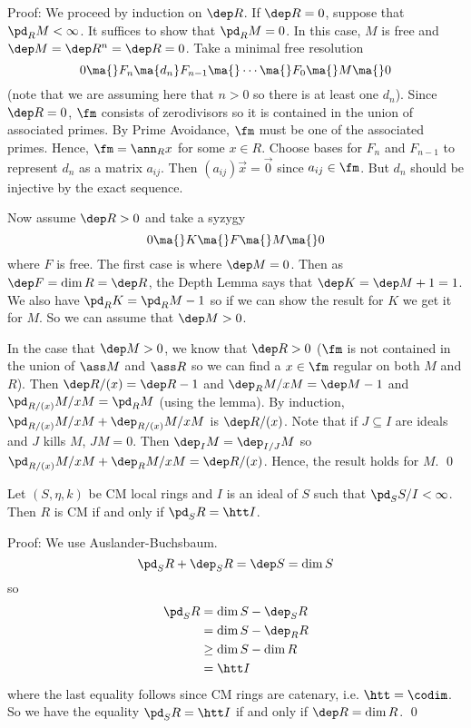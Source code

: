 \noindent Proof: We proceed by induction on $\dep R$. If $\dep R=0$, suppose that $\pd_R M<\infty$. It suffices to show that $\pd_R M=0$. In this case, $M$ is free and $\dep M=\dep R^n=\dep R=0$. Take a minimal free resolution
\[
0 \ma{} F_n \ma{d_n} F_{n-1} \ma{} \cdots \ma{} F_0 \ma{} M \ma{} 0
\]
(note that we are assuming here that $n>0$ so there is at least one $d_n$). Since $\dep R=0$, $\fm$ consists of zerodivisors so it is contained in the union of associated primes. By Prime Avoidance, $\fm$ must be one of the associated primes. Hence, $\fm=\ann_R x$ for some $x \in R$. Choose bases for $F_n$ and $F_{n-1}$ to represent $d_n$ as a matrix $a_{ij}$. Then $(a_{ij})\vec{x}=\vec{0}$ since $a_{ij} \in \fm$. But $d_n$ should be injective by the exact sequence. 

Now assume $\dep R>0$ and take a syzygy 
\[
0 \ma{} K \ma{} F \ma{} M \ma{} 0
\]
where $F$ is free. The first case is where $\dep M=0$. Then as $\dep F=\dim R=\dep R$, the Depth Lemma says that $\dep K=\dep M+1=1$. We also have $\pd_R K=\pd_R M-1$ so if we can show the result for $K$ we get it for $M$. So we can assume that $\dep M>0$.

In the case that $\dep M>0$, we know that $\dep R>0$ ($\fm$ is not contained in the union of $\ass M$ and $\ass R$ so we can find a $x \in \fm$ regular on both $M$ and $R$). Then $\dep R/(x)=\dep R-1$ and $\dep_R M/xM=\dep M-1$ and $\pd_{R/(x)} M/xM=\pd_R M$ (using the lemma). By induction, $\pd_{R/(x)} M/xM+ \dep_{R/(x)} M/xM$ is $\dep R/(x)$. Note that if $J \subseteq I$ are ideals and $J$ kills $M$, $JM=0$. Then $\dep_I M=\dep_{I/J} M$ so $\pd_{R/(x)} M/xM+\dep_R M/xM=\dep R/(x)$. Hence, the result holds for $M$. \qed \\

\begin{cor}
Let $(S,\eta,k)$ be CM local rings and $I$ is an ideal of $S$ such that $\pd_S S/I<\infty$. Then $R$ is CM if and only if $\pd_S R=\htt I$. 
\end{cor}

\noindent Proof: We use Auslander-Buchsbaum. 
\[
\pd_S R+ \dep_S R=\dep S=\dim S
\]
so 
\[
\begin{split}
\pd_S R&=\dim S- \dep_S R \\
&=\dim S - \dep_R R \\
&\geq \dim S-\dim R \\
&=\htt I
\end{split}
\]
where the last equality follows since CM rings are catenary, i.e. $\htt=\codim$. So we have the equality $\pd_S R= \htt I$ if and only if $\dep R=\dim R$. \qed \\

